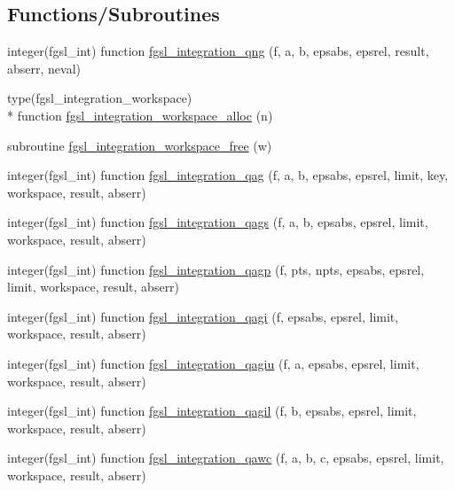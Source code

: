 \subsection*{Functions/\-Subroutines}
\begin{DoxyCompactItemize}
\item 
integer(fgsl\-\_\-int) function \hyperlink{integration_8finc_aba13a45b5692a07f1722280eca723ef5}{fgsl\-\_\-integration\-\_\-qng} (f, a, b, epsabs, epsrel, result, abserr, neval)
\item 
type(fgsl\-\_\-integration\-\_\-workspace) \\*
function \hyperlink{integration_8finc_a258c0d16c738f2b09e6ba3a095eb4c1a}{fgsl\-\_\-integration\-\_\-workspace\-\_\-alloc} (n)
\item 
subroutine \hyperlink{integration_8finc_a6b0e32245d2c47a94b7a0d377fd88e4b}{fgsl\-\_\-integration\-\_\-workspace\-\_\-free} (w)
\item 
integer(fgsl\-\_\-int) function \hyperlink{integration_8finc_a13d6dc8aee5e46de8ca23b39414615a2}{fgsl\-\_\-integration\-\_\-qag} (f, a, b, epsabs, epsrel, limit, key, workspace, result, abserr)
\item 
integer(fgsl\-\_\-int) function \hyperlink{integration_8finc_a0f40a3f4743cf93f49855ac87cdfe988}{fgsl\-\_\-integration\-\_\-qags} (f, a, b, epsabs, epsrel, limit, workspace, result, abserr)
\item 
integer(fgsl\-\_\-int) function \hyperlink{integration_8finc_ad3b94b869bbc1b157c6b378f8ca31edc}{fgsl\-\_\-integration\-\_\-qagp} (f, pts, npts, epsabs, epsrel, limit, workspace, result, abserr)
\item 
integer(fgsl\-\_\-int) function \hyperlink{integration_8finc_a6f86306a814963ccd09bc4a6839ba0c8}{fgsl\-\_\-integration\-\_\-qagi} (f, epsabs, epsrel, limit, workspace, result, abserr)
\item 
integer(fgsl\-\_\-int) function \hyperlink{integration_8finc_a4ec3624cdae37303102042cb3874ab7d}{fgsl\-\_\-integration\-\_\-qagiu} (f, a, epsabs, epsrel, limit, workspace, result, abserr)
\item 
integer(fgsl\-\_\-int) function \hyperlink{integration_8finc_a7292df51e041f35ed4d1c40e4b44e2b2}{fgsl\-\_\-integration\-\_\-qagil} (f, b, epsabs, epsrel, limit, workspace, result, abserr)
\item 
integer(fgsl\-\_\-int) function \hyperlink{integration_8finc_a9544e1c2217de9f6a9c8cafdf348330b}{fgsl\-\_\-integration\-\_\-qawc} (f, a, b, c, epsabs, epsrel, limit, workspace, result, abserr)
\item 

\end{DoxyCompactItemize}
